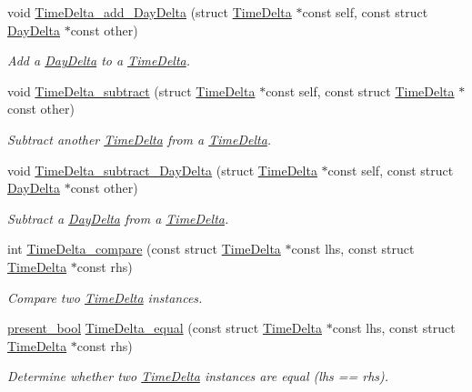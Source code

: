 \begin{DoxyCompactItemize}
void \hyperlink{time-delta_8h_a80aa67e85468bf70b53e1eecd3f3e4cd}{\-Time\-Delta\-\_\-add\-\_\-\-Day\-Delta} (struct \hyperlink{structTimeDelta}{\-Time\-Delta} $\ast$const self, const struct \hyperlink{structDayDelta}{\-Day\-Delta} $\ast$const other)
\begin{DoxyCompactList}\small\item\em \-Add a \hyperlink{structDayDelta}{\-Day\-Delta} to a \hyperlink{structTimeDelta}{\-Time\-Delta}. \end{DoxyCompactList}\item 
void \hyperlink{time-delta_8h_aabc9864d36d4b617bccd6af5baba8fa2}{\-Time\-Delta\-\_\-subtract} (struct \hyperlink{structTimeDelta}{\-Time\-Delta} $\ast$const self, const struct \hyperlink{structTimeDelta}{\-Time\-Delta} $\ast$const other)
\begin{DoxyCompactList}\small\item\em \-Subtract another \hyperlink{structTimeDelta}{\-Time\-Delta} from a \hyperlink{structTimeDelta}{\-Time\-Delta}. \end{DoxyCompactList}\item 
void \hyperlink{time-delta_8h_a4c1cce3fe60da8412454e06e9b4a8a1d}{\-Time\-Delta\-\_\-subtract\-\_\-\-Day\-Delta} (struct \hyperlink{structTimeDelta}{\-Time\-Delta} $\ast$const self, const struct \hyperlink{structDayDelta}{\-Day\-Delta} $\ast$const other)
\begin{DoxyCompactList}\small\item\em \-Subtract a \hyperlink{structDayDelta}{\-Day\-Delta} from a \hyperlink{structTimeDelta}{\-Time\-Delta}. \end{DoxyCompactList}\item 
int \hyperlink{time-delta_8h_a1864d69bcd1b4cf445555bc72c21a653}{\-Time\-Delta\-\_\-compare} (const struct \hyperlink{structTimeDelta}{\-Time\-Delta} $\ast$const lhs, const struct \hyperlink{structTimeDelta}{\-Time\-Delta} $\ast$const rhs)
\begin{DoxyCompactList}\small\item\em \-Compare two \hyperlink{structTimeDelta}{\-Time\-Delta} instances. \end{DoxyCompactList}\item 
\hyperlink{types_8h_a1c24e2cdd988b886e889080ded176ae0}{present\-\_\-bool} \hyperlink{time-delta_8h_a99614ad03a84af18cd60d8b25d5c4cee}{\-Time\-Delta\-\_\-equal} (const struct \hyperlink{structTimeDelta}{\-Time\-Delta} $\ast$const lhs, const struct \hyperlink{structTimeDelta}{\-Time\-Delta} $\ast$const rhs)
\begin{DoxyCompactList}\small\item\em \-Determine whether two \hyperlink{structTimeDelta}{\-Time\-Delta} instances are equal (lhs == rhs). \end{DoxyCompactList}\item 

\end{DoxyCompactItemize}
